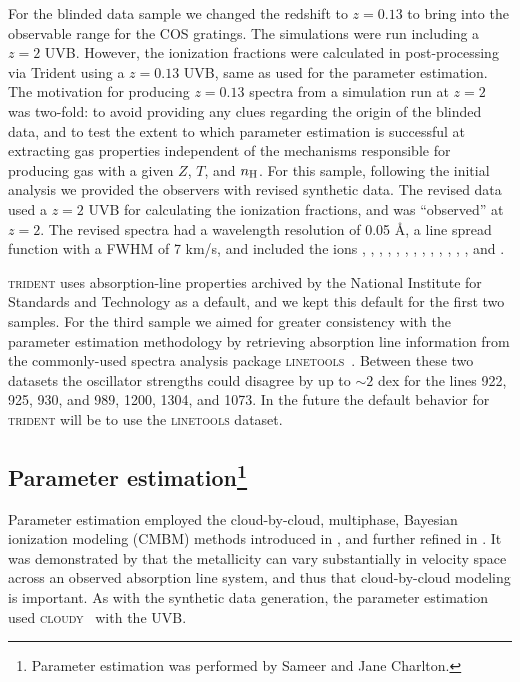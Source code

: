 \documentclass[fleqn,usenatbib]{mnras}
\begin{document}
For the blinded data sample we changed the redshift to $z=0.13$ to bring  into the observable range for the COS gratings.
The simulations were run including a $z=2$ UVB.
However, the ionization fractions were calculated in post-processing via Trident using a $z=0.13$ \cite{haardt2012RADIATIVE} UVB, same as used for the parameter estimation.
The motivation for producing $z=0.13$ spectra from a simulation run at $z=2$ was two-fold:
to avoid providing any clues regarding the origin of the blinded data,
and to test the extent to which parameter estimation is successful at extracting gas properties independent of the mechanisms responsible for producing gas with a given $Z$, $T$, and $n_{\rm H}$.
For this sample, following the initial analysis we provided the observers with revised synthetic data.
The revised data used a $z=2$ UVB for calculating the ionization fractions, and was ``observed'' at $z=2$.
The revised spectra had a wavelength resolution of 0.05 \AA,
a line spread function with a FWHM of 7 km/s,
and included the ions , , , , , , , , , , , , , and .

\textsc{trident} uses absorption-line properties archived by the National Institute for Standards and Technology as a default, and we kept this default for the first two samples.
For the third sample we aimed for greater consistency with the parameter estimation methodology by retrieving absorption line information from the commonly-used spectra analysis package \textsc{linetools}~\citep{prochaska2016Linetools}.
Between these two datasets the oscillator strengths could disagree by up to $\sim 2$ dex for the lines  922, 925, 930, and 989,  1200,  1304, and  1073.
In the future the default behavior for \textsc{trident} will be to use the \textsc{linetools} dataset.

\subsection[Parameter estimation]{Parameter estimation\footnote{
 Parameter estimation was performed by Sameer and Jane Charlton.}}
\label{s:  parameter estimation}

 Parameter estimation employed the cloud-by-cloud, multiphase, Bayesian ionization modeling (CMBM) methods introduced in \cite{sameer2021Cloudbycloud}, and further refined in \cite{sameer2022Probing}.
 It was demonstrated by \cite{Prochter2010,lehner2019COS,Wotta2019,Zahedy2021,lehner2022Intermediate} that the metallicity can vary substantially in velocity space across an observed absorption line system, and thus that cloud-by-cloud modeling is important.
 As with the synthetic data generation, the  parameter estimation used \textsc{cloudy}~\citep{ferland20132013} with the \cite{haardt2012RADIATIVE} UVB.
\end{document}
